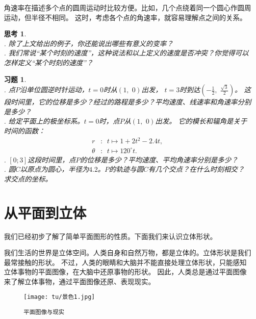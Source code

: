 \documentclass[12pt,UTF8]{ctexbook}
\theoremstyle{definition}
\theoremstyle{plain}
\newtheorem{sk}{思考}[section]
\newtheorem{xt}{习题}[section]
\begin{document}
角速率在描述多个点的圆周运动时比较方便。比如，几个点绕着同一个圆心作圆周运动，但半径不相同。
这时，考虑各个点的角速率，就容易理解点之间的关系。

\begin{sk}
    \mbox{}\\
    . 除了上文给出的例子，你还能说出哪些有意义的变率？\\
    . 我们常说“某个时刻的速度”，这种说法和以上定义的速度是否冲突？你觉得可以怎样定义“某个时刻的速度”？

\end{sk}

\begin{xt}
    \mbox{} \\
    . 点$P$沿单位圆逆时针运动，$t=0$时从$(1,\,\,0)$出发，
    $t=3$时到达$\left(-\frac{1}{2},\,\,\frac{\sqrt{3}}{2}\right)$。
    这段时间里，它的位移是多少？经过的路程是多少？平均速度、线速率和角速率分别是多少？\\
    . 给定平面上的极坐标系。$t=0$时，点$P$从$(1,\,\,0)$出发。
    它的模长和辐角是关于时间的函数：
    \begin{align*}
        r &: \,\,\, t \mapsto 1 + 2t^2 - 2.4t,  \\
        \theta &: \,\,\, t\mapsto 120^\circ t. 
    \end{align*}
    . $[0; 3]$这段时间里，点$P$的位移是多少？平均速度、平均角速率分别是多少？\\
    . 圆$C$以原点为圆心，半径为$4.2$。$P$的轨迹与圆$C$有几个交点？在什么时刻相交？求交点的坐标。
\end{xt}

\chapter{从平面到立体}

我们已经初步了解了简单平面图形的性质。下面我们来认识立体形状。

我们生活的世界是立体空间。人类自身和自然万物，都是立体的。立体形状是我们最常接触的形状。
不过，人类的眼睛和大脑并不能直接处理立体形状，只能感知立体事物的平面图像，在大脑中还原事物的形状。
因此，人类总是通过平面图像来了解立体事物，通过平面图像还原、表现现实。

\begin{figure}[h] %
    \vspace{4pt}
    \centering
    \texttt{[image: tu/景色1.jpg]}
    \caption*{\texttt{平面图像与现实}}
\end{figure}
\end{document}

